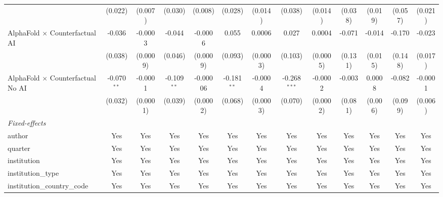\begin{tabular}{lcccccccccccc}
                                            & (0.022)       & (0.007)       & (0.030)       & (0.008)      & (0.028)       & (0.014)       & (0.038)        & (0.014)       & (0.038) & (0.019)      & (0.057)      & (0.021)\\   
   AlphaFold $\times$ Counterfactual AI     & -0.036        & -0.0003       & -0.044        & -0.0006      & 0.055         & 0.0006        & 0.027          & 0.0004        & -0.071  & -0.014       & -0.170       & -0.023\\   
                                            & (0.038)       & (0.0009)      & (0.046)       & (0.0009)     & (0.093)       & (0.0003)      & (0.103)        & (0.0005)      & (0.131) & (0.015)      & (0.148)      & (0.017)\\   
   AlphaFold $\times$ Counterfactual No AI  & -0.070$^{**}$ & -0.0001       & -0.109$^{**}$ & -0.00006     & -0.181$^{**}$ & -0.0004       & -0.268$^{***}$ & -0.0002       & -0.003  & 0.0008       & -0.082       & -0.0001\\   
                                            & (0.032)       & (0.0001)      & (0.039)       & (0.0002)     & (0.068)       & (0.0003)      & (0.070)        & (0.0002)      & (0.081) & (0.006)      & (0.099)      & (0.006)\\   
   \midrule
   \emph{Fixed-effects}\\
   author                                   & Yes           & Yes           & Yes           & Yes          & Yes           & Yes           & Yes            & Yes           & Yes     & Yes          & Yes          & Yes\\  
   quarter                                  & Yes           & Yes           & Yes           & Yes          & Yes           & Yes           & Yes            & Yes           & Yes     & Yes          & Yes          & Yes\\  
   institution                              & Yes           & Yes           & Yes           & Yes          & Yes           & Yes           & Yes            & Yes           & Yes     & Yes          & Yes          & Yes\\  
   institution\_type                        & Yes           & Yes           & Yes           & Yes          & Yes           & Yes           & Yes            & Yes           & Yes     & Yes          & Yes          & Yes\\  
   institution\_country\_code               & Yes           & Yes           & Yes           & Yes          & Yes           & Yes           & Yes            & Yes           & Yes     & Yes          & Yes          & Yes\\  

\end{tabular}
